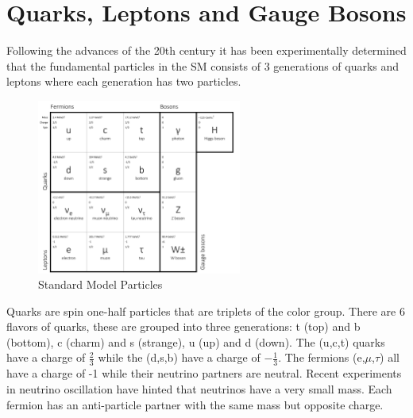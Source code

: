 \section{Quarks, Leptons and Gauge Bosons}%
Following the advances of the 20th century it has been experimentally 
determined that the fundamental
particles in the SM consists of 3 generations of quarks and leptons
where each generation has two particles. 
\begin{figure}[hb]
  \centering
	\includegraphics[width=0.6\textwidth]{images/SMParticles2.png}
  	\caption[SM Particles]
   	{Standard Model Particles}
	\label{fig:SMParticles}
\end{figure}
Quarks are spin one-half particles that are triplets of the color group. 
There are 6 flavors of quarks, these are grouped into three generations:
t (top) and b (bottom), c (charm) and s (strange), u (up) and d (down). 
The (u,c,t) quarks have a charge of $\frac{2}{3}$ while the (d,s,b) have 
a charge of $-\frac{1}{3}$.
The fermions (e,$\mu$,$\tau$) all have a charge of -1 while their neutrino 
partners are neutral. Recent experiments in neutrino oscillation have hinted
that neutrinos have a very small mass.
Each fermion has an anti-particle partner with the same mass but opposite charge.

